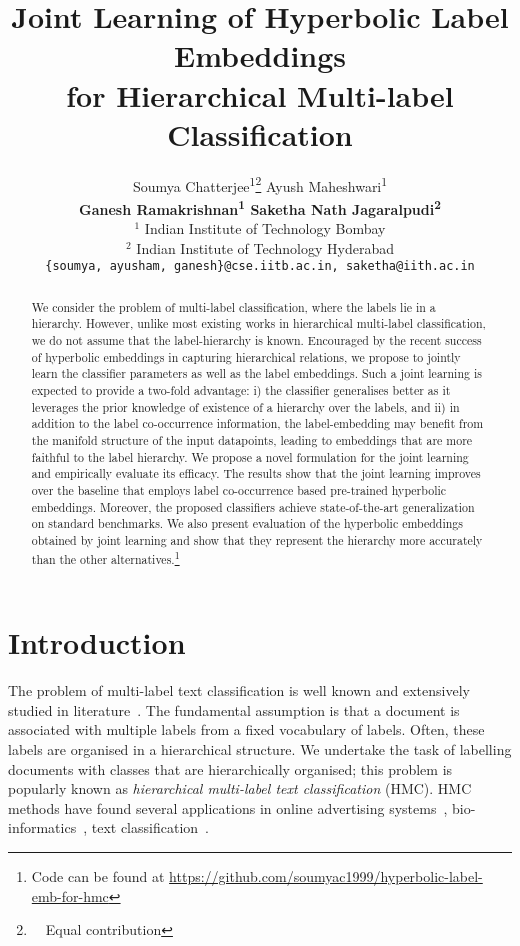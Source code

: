 \documentclass[11pt,a4paper]{article}
\title{Joint Learning of Hyperbolic Label Embeddings\\ for Hierarchical Multi-label Classification}
\author{
Soumya Chatterjee\textsuperscript{\rm 1}\thanks{~~Equal contribution} \hspace{0.4em} Ayush Maheshwari\textsuperscript{\rm 1}\footnotemark[1] \\
\textbf{Ganesh Ramakrishnan\textsuperscript{\rm 1} \hspace{0.4em} Saketha Nath Jagaralpudi\textsuperscript{\rm 2}}\\
$^1$ Indian Institute of Technology Bombay\\
$^2$ Indian Institute of Technology Hyderabad \\
\texttt{\{soumya, ayusham, ganesh\}@cse.iitb.ac.in, saketha@iith.ac.in}
}
\date{}
\begin{document}
\maketitle
\begin{abstract}
We consider the problem of multi-label classification, where the labels lie in a hierarchy. However, unlike most existing works in hierarchical multi-label classification, we do not assume that the label-hierarchy is known. Encouraged by the recent success of hyperbolic embeddings in capturing hierarchical relations, we propose to jointly learn the classifier parameters as well as the label embeddings. Such a joint learning is expected to provide a two-fold advantage: i) the classifier generalises better as it leverages the prior knowledge of existence of a hierarchy over the labels, and ii) in addition to the label co-occurrence information, the label-embedding may benefit from the manifold structure of the input datapoints, leading to embeddings that are more faithful to the label hierarchy. We propose a novel formulation for the joint learning and empirically evaluate its efficacy. The results show that the joint learning improves over the baseline that employs label co-occurrence based pre-trained hyperbolic embeddings. Moreover, the proposed classifiers achieve state-of-the-art generalization on standard benchmarks. We also present evaluation of the hyperbolic embeddings obtained by joint learning and show that they represent the hierarchy more accurately than the other alternatives.\footnote{Code can be found at \url{https://github.com/soumyac1999/hyperbolic-label-emb-for-hmc}}
\end{abstract}

\section{Introduction}
The problem of multi-label text classification is well known and extensively studied in literature~\citep{mccallum1999multi,yang2009effective,liu2017deep}. The fundamental assumption is that a document is associated with multiple labels from a fixed vocabulary of labels. Often, these labels are organised in a hierarchical structure. We undertake the task of labelling documents with classes that are hierarchically organised; this problem is popularly known as \textit{hierarchical multi-label text classification} (HMC). HMC methods have found several applications in online advertising systems~\citep{agrawal2013multi}, bio-informatics~\citep{peng2016deepmesh, triguero2016labelling}, text classification~\citep{rousu2006kernel, emnlp}.
\end{document}
